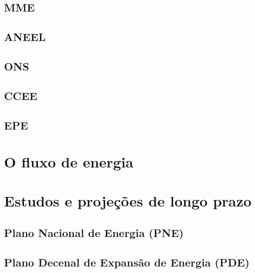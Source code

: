 \documentclass[grad,numbers]{coppe}
\begin{document}
  \hypertarget{mme}{%
  \subsection{MME}\label{mme}}

  \hypertarget{aneel}{%
  \subsection{ANEEL}\label{aneel}}

  \hypertarget{ons}{%
  \subsection{ONS}\label{ons}}

  \hypertarget{ccee}{%
  \subsection{CCEE}\label{ccee}}

  \hypertarget{epe}{%
  \subsection{EPE}\label{epe}}

  \hypertarget{o-fluxo-de-energia}{%
  \section{O fluxo de energia}\label{o-fluxo-de-energia}}

  \hypertarget{estudos-e-projeuxe7uxf5es-de-longo-prazo}{%
  \section{Estudos e projeções de longo prazo}\label{estudos-e-projeuxe7uxf5es-de-longo-prazo}}

  \hypertarget{plano-nacional-de-energia-pne}{%
  \subsection{Plano Nacional de Energia (PNE)}\label{plano-nacional-de-energia-pne}}

  \hypertarget{plano-decenal-de-expansuxe3o-de-energia-pde}{%
  \subsection{Plano Decenal de Expansão de Energia (PDE)}\label{plano-decenal-de-expansuxe3o-de-energia-pde}}
\end{document}
